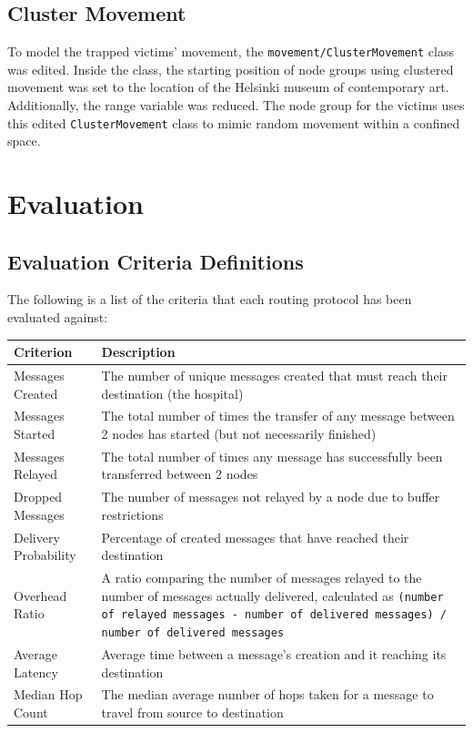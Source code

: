 \documentclass{article}
\begin{document}
\subsection{Cluster Movement}
To model the trapped victims' movement, the \texttt{movement/ClusterMovement} class was edited. Inside the class, the starting position of node groups using clustered movement was set to the location of the Helsinki museum of contemporary art. Additionally, the range variable was reduced. The node group for the victims uses this edited \texttt{ClusterMovement} class to mimic random movement within a confined space.

\section{Evaluation}
\subsection{Evaluation Criteria Definitions}
The following is a list of the criteria that each routing protocol has been evaluated against:

\begin{center}
\begin{tabular}{|l|p{13cm}|}
\hline
\textbf{Criterion} & \textbf{Description} \\ \hline
Messages Created & The number of unique messages created that must reach their destination (the hospital) \\ \hline
Messages Started & The total number of times the transfer of any message between 2 nodes has started (but not necessarily finished) \\ \hline
Messages Relayed & The total number of times any message has successfully been transferred between 2 nodes \\ \hline
Dropped Messages & The number of messages not relayed by a node due to buffer restrictions \\ \hline
Delivery Probability & Percentage of created messages that have reached their destination \\ \hline
Overhead Ratio & A ratio comparing the number of messages relayed to the number of messages actually delivered, calculated as \texttt{(number of relayed messages - number of delivered messages) / number of delivered messages} \\ \hline
Average Latency & Average time between a message's creation and it reaching its destination \\ \hline
Median Hop Count & The median average number of hops taken for a message to travel from source to destination \\ \hline
\end{tabular}
\end{center}
\end{document}
